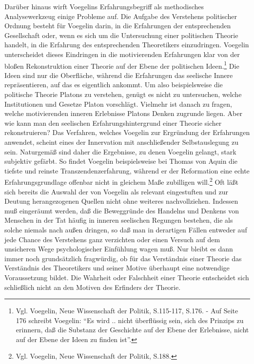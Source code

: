 Darüber hinaus wirft Voegelins Erfahrungsbegriff als methodisches
Analysewerkzeug einige Probleme auf. Die Aufgabe des Verstehens politischer
Ordnung besteht für Voegelin darin, in die Erfahrungen der entsprechenden
Gesellschaft oder, wenn es sich um die Untersuchung einer politischen Theorie
handelt, in die Erfahrung des entsprechenden Theoretikers einzudringen.
Voegelin unterscheidet dieses Eindringen in die motivierenden Erfahrungen klar
von der bloßen Rekonstruktion einer Theorie auf der Ebene der politischen
Ideen.\footnote{Vgl.  Voegelin, Neue Wissenschaft der Politik, S.115-117,
  S.176. - Auf Seite 176 schreibt Voegelin: "`Es wird .. nicht überflüssig
  sein, sich des Prinzips zu erinnern, daß die Substanz der Geschichte auf der
  Ebene der Erlebnisse, nicht auf der Ebene der Ideen zu finden ist"'.} Die
Ideen sind nur die Oberfläche, während die Erfahrungen das seelische Innere
repräsentieren, auf das es eigentlich ankommt. Um also beispielsweise die
politische Theorie Platons zu verstehen, genügt es nicht zu untersuchen,
welche Institutionen und Gesetze Platon vorschlägt. Vielmehr ist danach zu
fragen, welche motivierenden inneren Erlebnisse Platons Denken zugrunde
liegen. Aber wie kann man den seelischen Erfahrungshintergrund einer Theorie
sicher rekonstruieren? Das Verfahren, welches Voegelin zur Ergründung der
Erfahrungen anwendet, scheint eines der Innervation mit anschließender
Selbstauslegung zu sein. Naturgemäß sind daher die Ergebnisse, zu denen
Voegelin gelangt, stark subjektiv gefärbt. So findet Voegelin beispielsweise
bei Thomas von Aquin die tiefste und reinste Transzendenzerfahrung, während er
der Reformation eine echte Erfahrungsgrundlage offenbar nicht in gleichem Maße
zubilligen will.\footnote{Vgl. Voegelin, Neue Wissenschaft der Politik,
  S.188.} Oft läßt sich bereits die Auswahl der von Voegelin als relevant
eingestuften und zur Deutung herangezogenen Quellen nicht ohne weiteres
nachvollziehen. Indessen muß eingeräumt werden, daß die Beweggründe des
Handelns und Denkens von Menschen in der Tat häufig in inneren seelischen
Regungen bestehen, die als solche niemals nach außen dringen, so daß man in
derartigen Fällen entweder auf jede Chance des Verstehens ganz verzichten oder
einen Versuch auf dem unsicheren Wege psychologischer Einfühlung wagen muß.
Nur bleibt es dann immer noch grundsätzlich fragwürdig, ob für das Verständnis
einer Theorie das Verständnis des Theoretikers und seiner Motive überhaupt
eine notwendige Voraussetzung bildet. Die Wahrheit oder Falschheit einer
Theorie entscheidet sich schließlich nicht an den Motiven des Erfinders der
Theorie.

